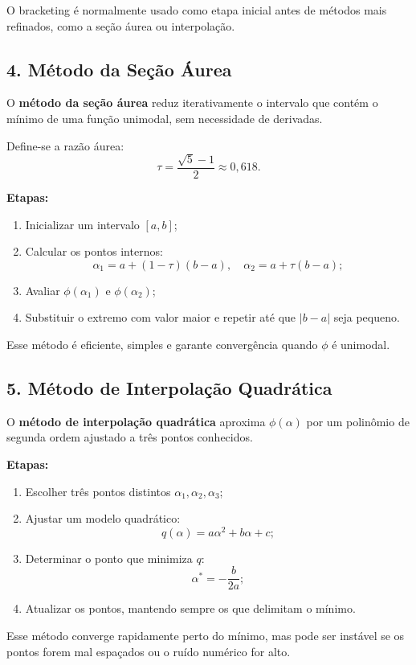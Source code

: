 \documentclass[9pt,a4paper]{extarticle}
\begin{document}
O bracketing é normalmente usado como etapa inicial antes de métodos mais refinados, como a seção áurea ou interpolação.

\subsection*{4. Método da Seção Áurea}

O \textbf{método da seção áurea} reduz iterativamente o intervalo que contém o mínimo de uma função unimodal, sem necessidade de derivadas.

Define-se a razão áurea:
\[
\tau = \frac{\sqrt{5} - 1}{2} \approx 0{,}618.
\]

\textbf{Etapas:}
\begin{enumerate}
  \item Inicializar um intervalo \( [a,b] \);
  \item Calcular os pontos internos:
  \[
  \alpha_1 = a + (1 - \tau)(b - a), \quad
  \alpha_2 = a + \tau(b - a);
  \]
  \item Avaliar \( \phi(\alpha_1) \) e \( \phi(\alpha_2) \);
  \item Substituir o extremo com valor maior e repetir até que \( |b - a| \) seja pequeno.
\end{enumerate}

Esse método é eficiente, simples e garante convergência quando \( \phi \) é unimodal.

\subsection*{5. Método de Interpolação Quadrática}

O \textbf{método de interpolação quadrática} aproxima \( \phi(\alpha) \) por um polinômio de segunda ordem ajustado a três pontos conhecidos.

\textbf{Etapas:}
\begin{enumerate}
  \item Escolher três pontos distintos \( \alpha_1, \alpha_2, \alpha_3 \);
  \item Ajustar um modelo quadrático:
  \[
  q(\alpha) = a\alpha^2 + b\alpha + c;
  \]
  \item Determinar o ponto que minimiza \( q \):
  \[
  \alpha^* = -\frac{b}{2a};
  \]
  \item Atualizar os pontos, mantendo sempre os que delimitam o mínimo.
\end{enumerate}

Esse método converge rapidamente perto do mínimo, mas pode ser instável se os pontos forem mal espaçados ou o ruído numérico for alto.
\end{document}
